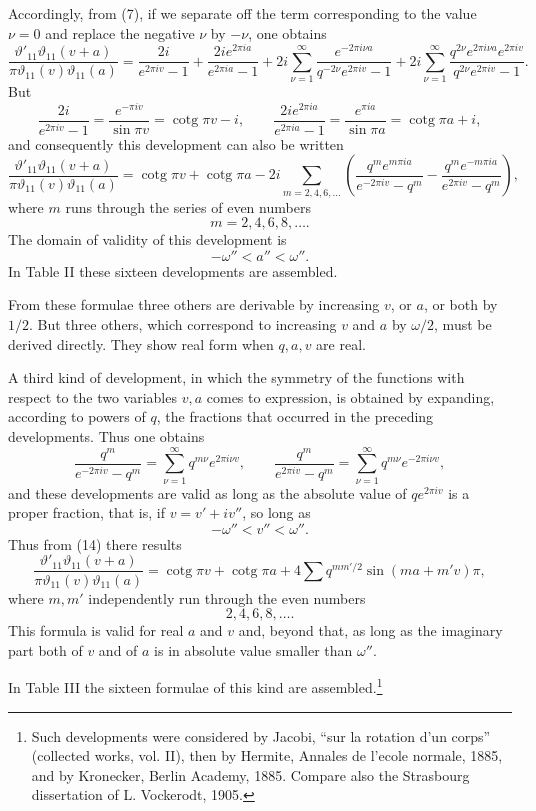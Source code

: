 \documentclass[11pt]{article}
\providecommand{\tht}{\vartheta}
\providecommand{\cotg}{\operatorname{cotg}}
\begin{document}
Accordingly, from (7), if we separate off the term corresponding to the value $\nu=0$ and replace the negative $\nu$ by $-\nu$, one obtains
\[
\frac{\tht'_{11}\tht_{11}(v+a)}{\pi\tht_{11}(v)\tht_{11}(a)}
=\frac{2i}{e^{2\pi iv}-1}+\frac{2ie^{2\pi ia}}{e^{2\pi ia}-1}
+2i\sum_{\nu=1}^{\infty}\frac{e^{-2\pi i\nu a}}{q^{-2\nu}e^{2\pi iv}-1}
+2i\sum_{\nu=1}^{\infty}\frac{q^{2\nu}e^{2\pi i\nu a}e^{2\pi iv}}{q^{2\nu}e^{2\pi iv}-1}.
\]
But
\[
\frac{2i}{e^{2\pi iv}-1}=\frac{e^{-\pi iv}}{\sin\pi v}=\cotg\pi v-i,
\qquad
\frac{2ie^{2\pi ia}}{e^{2\pi ia}-1}=\frac{e^{\pi ia}}{\sin\pi a}=\cotg\pi a+i,
\]
and consequently this development can also be written
\begin{equation}
\frac{\tht'_{11}\tht_{11}(v+a)}{\pi\tht_{11}(v)\tht_{11}(a)}
=\cotg\pi v+\cotg\pi a
-2i\sum_{m=2,4,6,\ldots}\left(
\frac{q^m e^{m\pi ia}}{e^{-2\pi iv}-q^m}
-\frac{q^m e^{-m\pi ia}}{e^{2\pi iv}-q^m}
\right),
\tag{14}
\end{equation}
where $m$ runs through the series of even numbers
\[
m=2,4,6,8,\ldots.
\]
The domain of validity of this development is
\[
-\omega''<a''<\omega''.
\]
In Table II these sixteen developments are assembled.

From these formulae three others are derivable by increasing $v$, or $a$, or both by $1/2$. But three others, which correspond to increasing $v$ and $a$ by $\omega/2$, must be derived directly. They show real form when $q,a,v$ are real.

A third kind of development, in which the symmetry of the functions with respect to the two variables $v,a$ comes to expression, is obtained by expanding, according to powers of $q$, the fractions that occurred in the preceding developments. Thus one obtains
\[
\frac{q^m}{e^{-2\pi iv}-q^m}=\sum_{\nu=1}^{\infty}q^{m\nu}e^{2\pi i\nu v},
\qquad
\frac{q^m}{e^{2\pi iv}-q^m}=\sum_{\nu=1}^{\infty}q^{m\nu}e^{-2\pi i\nu v},
\]
and these developments are valid as long as the absolute value of $qe^{2\pi iv}$ is a proper fraction, that is, if $v=v'+iv''$, so long as
\[
-\omega''<v''<\omega''.
\]
Thus from (14) there results
\[
\frac{\tht'_{11}\tht_{11}(v+a)}{\pi\tht_{11}(v)\tht_{11}(a)}
=\cotg\pi v+\cotg\pi a+4\sum q^{mm'/2}\sin(m a+m'v)\pi,
\]
where $m,m'$ independently run through the even numbers
\[
2,4,6,8,\ldots.
\]
This formula is valid for real $a$ and $v$ and, beyond that, as long as the imaginary part both of $v$ and of $a$ is in absolute value smaller than $\omega''$.

In Table III the sixteen formulae of this kind are assembled.\footnote{Such developments were considered by Jacobi, ``sur la rotation d'un corps'' (collected works, vol. II), then by Hermite, Annales de l'ecole normale, 1885, and by Kronecker, Berlin Academy, 1885. Compare also the Strasbourg dissertation of L. Vockerodt, 1905.}
\end{document}
